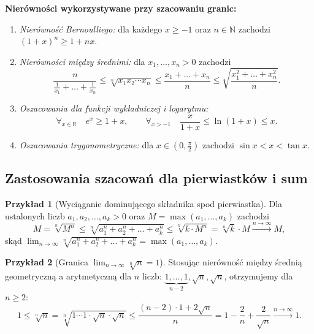 \documentclass[11pt, a4paper]{article}
\theoremstyle{plain}
\theoremstyle{definition}
\newtheorem*{przyklad}{Przykład}
\begin{document}
\noindent\textbf{Nierówności wykorzystywane przy szacowaniu granic:}
\begin{enumerate}
    \item \emph{Nierówność Bernoulliego:} dla każdego $x \geqslant -1$ oraz $n \in \mathbb{N}$ zachodzi $(1 + x)^n \geqslant 1 + nx$.
    \item \emph{Nierówności między średnimi:} dla $x_1, \dots, x_n > 0$ zachodzi
    \[
    \frac{n}{\frac{1}{x_1} + \dots + \frac{1}{x_n}} \leqslant \sqrt[n]{x_1 x_2 \cdots x_n} \leqslant \frac{x_1 + \dots + x_n}{n} \leqslant \sqrt{\frac{x_1^2 + \dots + x_n^2}{n}}.
    \]
    \item \emph{Oszacowania dla funkcji wykładniczej i logarytmu:}
    \[
    \forall_{x \in \mathbb{R}} \quad e^x \geqslant 1 + x, \qquad \forall_{x > -1} \quad \frac{x}{1 + x} \leqslant \ln(1 + x) \leqslant x.
    \]
    \item \emph{Oszacowania trygonometryczne:} dla $x \in \left(0, \frac{\pi}{2}\right)$ zachodzi $\sin x < x < \tan x$.
\end{enumerate}

\subsection{Zastosowania szacowań dla pierwiastków i sum}

\begin{przyklad}[Wyciąganie dominującego składnika spod pierwiastka]
Dla ustalonych liczb $a_1, a_2, \dots, a_k > 0$ oraz $M = \max(a_1, \dots, a_k)$ zachodzi
\[
M = \sqrt[n]{M^n} \leqslant \sqrt[n]{a_1^n + a_2^n + \dots + a_k^n} \leqslant \sqrt[n]{k \cdot M^n} = \sqrt[n]{k} \cdot M \xrightarrow{n\to\infty} M,
\]
skąd $\lim_{n\to\infty} \sqrt[n]{a_1^n + a_2^n + \dots + a_k^n} = \max(a_1, \dots, a_k)$.
\end{przyklad}

\begin{przyklad}[Granica $\lim_{n\to\infty} {\sqrt[n]{n} = 1}$]
Stosując nierówność między średnią geometryczną a arytmetyczną dla $n$ liczb: $\underbrace{1, \dots, 1}_{n-2}, \sqrt{n}, \sqrt{n}$, otrzymujemy dla $n \geqslant 2$:
\[
1 \leqslant \sqrt[n]{n} = \sqrt[n]{1 \cdots 1 \cdot \sqrt{n} \cdot \sqrt{n}} \leqslant \frac{(n-2)\cdot 1 + 2\sqrt{n}}{n} = 1 - \frac{2}{n} + \frac{2}{\sqrt{n}} \xrightarrow{n\to\infty} 1.
\]
\end{przyklad}
\end{document}

